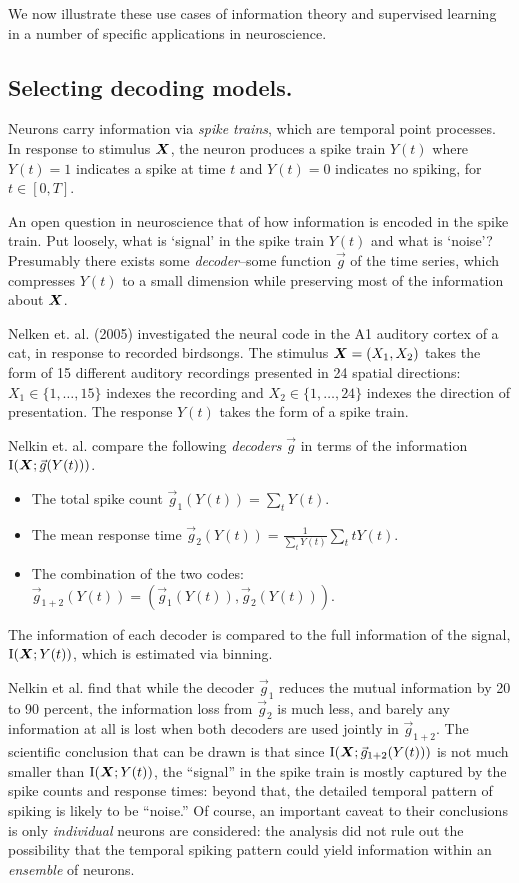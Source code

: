 We now illustrate these use cases of information theory and supervised
learning in a number of specific applications in neuroscience.

\subsection{Selecting decoding models.}\label{sec:model_selection}
Neurons carry information via \emph{spike trains}, which are temporal
point processes.  In response to stimulus $\boldsymbol{X}$, the neuron produces a
spike train $Y(t)$ where $Y(t) = 1$ indicates a spike at time $t$ and
$Y(t) = 0$ indicates no spiking, for $t \in [0, T]$.

An open question in neuroscience that of how information is encoded in
the spike train.  Put loosely, what is `signal' in the spike train
$Y(t)$ and what is `noise'?  Presumably there exists
some \emph{decoder}--some function $\vec{g}$ of the time series, which
compresses $Y(t)$ to a small dimension while preserving most of the
information about $\boldsymbol{X}$.

Nelken et. al. (2005) investigated the neural code in the A1 auditory
cortex of a cat, in response to recorded birdsongs.  The stimulus $\boldsymbol{X}
= (X_1, X_2)$ takes the form of 15 different auditory recordings
presented in 24 spatial directions: $X_1 \in \{1,\hdots, 15\}$ indexes
the recording and $X_2 \in \{1,\hdots, 24\}$ indexes the direction of
presentation.  The response $Y(t)$ takes the form of a spike train.

Nelkin et. al. compare the following \emph{decoders} $\vec{g}$ in terms
of the information $\text{I}(\boldsymbol{X}; \vec{g}(Y(t)))$.
\begin{itemize}
\item The total spike count $\vec{g}_1(Y(t)) = \sum_t Y(t)$.
\item The mean response time $\vec{g}_2(Y(t)) = \frac{1}{\sum_t Y(t)} \sum_t t Y(t)$.
\item The combination of the two codes: $\vec{g}_{1+2}(Y(t)) = (\vec{g}_1(Y(t)), \vec{g}_2(Y(t)))$.
\end{itemize}
The information of each decoder is compared to the full information of
the signal, $\text{I}(\boldsymbol{X}; Y(t))$, which is estimated via binning.

Nelkin et al. find that while the decoder $\vec{g}_1$ reduces the
mutual information by 20 to 90 percent, the information loss from
$\vec{g}_2$ is much less, and barely any information at all is lost
when both decoders are used jointly in $\vec{g}_{1+2}$.  The
scientific conclusion that can be drawn is that since
$\text{I}(\boldsymbol{X}; \vec{g}_{1+2}(Y(t)))$ is not much smaller than
$\text{I}(\boldsymbol{X}; Y(t))$, the ``signal'' in the spike train is mostly
captured by the spike counts and response times: beyond that, the
detailed temporal pattern of spiking is likely to be ``noise.''  Of
course, an important caveat to their conclusions is
only \emph{individual} neurons are considered: the analysis did not
rule out the possibility that the temporal spiking pattern could yield
information within an \emph{ensemble} of neurons.

